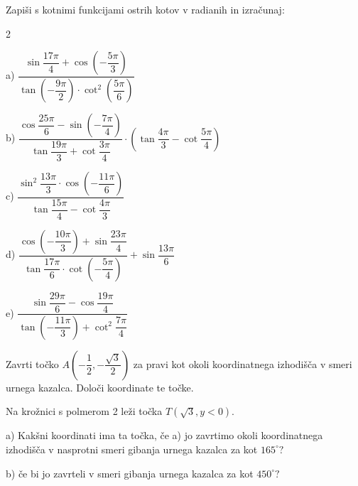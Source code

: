 \documentclass[a4paper,12pt]{letter}
\begin{document}
\begin{naloga}

Zapiši s kotnimi funkcijami ostrih kotov v radianih in izračunaj:
\begin{multicols}{2}
    
a) 
$
\dfrac{\sin\dfrac{17\pi}{4} + \cos\left(-\dfrac{5\pi}{3}\right)}{\tan\left(-\dfrac{9\pi}{2}\right) \cdot \cot^2\left(\dfrac{5\pi}{6}\right)}
$

b)
$
\dfrac{\cos\dfrac{25\pi}{6} - \sin\left(-\dfrac{7\pi}{4}\right)}{\tan\dfrac{19\pi}{3} + \cot\dfrac{3\pi}{4}}\cdot \left(\tan \dfrac{4\pi}{3}-\cot\dfrac{5\pi}{4}\right)
$

c)
$
\dfrac{\sin^2\dfrac{13\pi}{3} \cdot \cos\left(-\dfrac{11\pi}{6}\right)}{\tan\dfrac{15\pi}{4} - \cot\dfrac{4\pi}{3}}
$

d) $
\dfrac{\cos\left(-\dfrac{10\pi}{3}\right) + \sin\dfrac{23\pi}{4}}{\tan\dfrac{17\pi}{6} \cdot \cot\left(-\dfrac{5\pi}{4}\right)}+\sin \dfrac{13\pi}{6}$

e) 
$
\dfrac{\sin\dfrac{29\pi}{6}- \cos\dfrac{19\pi}{4}}{\tan\left(-\dfrac{11\pi}{3}\right) + \cot^2\dfrac{7\pi}{4}}
$
\end{multicols}
\end{naloga}
\begin{naloga}
    Zavrti točko $A(-\dfrac{1}{2},-\dfrac{\sqrt{3}}{2})$ za pravi kot okoli koordinatnega izhodišča v smeri urnega kazalca. Določi koordinate te točke. 
\end{naloga}
\begin{naloga}
    Na krožnici s polmerom 2 leži točka $T(\sqrt{3},y<0).$ 
     
     a) Kakšni koordinati ima ta točka, če a) jo zavrtimo okoli koordinatnega izhodišča v nasprotni smeri gibanja urnega kazalca za kot $165^{\circ}?$  

b) če bi jo zavrteli v smeri gibanja urnega kazalca za kot $450^{\circ}?$  
\end{naloga}
\newpage
\end{document}

